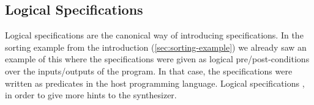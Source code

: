 
\subsection{Logical Specifications}
\label{sec:logical}

Logical specifications are the canonical way of introducing specifications. In
the sorting example from the introduction (\ref{sec:sorting-example}) we already
saw an example of this where the specifications were given as logical
pre/post-conditions over the inputs/outputs of the program. In that case, the
specifications were written as predicates in the host programming language.
Logical specifications , in order to give more hints to the
synthesizer.






